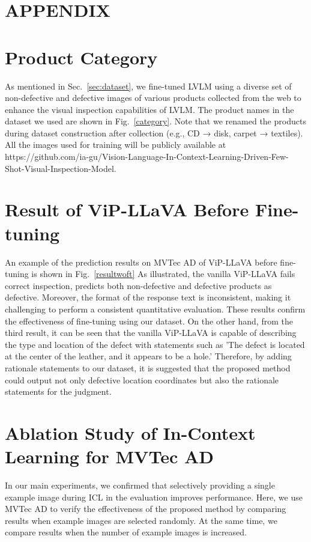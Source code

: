 \section*{\MakeUppercase{Appendix}}

\section{Product Category}
As mentioned in Sec.~\ref{sec:dataset}, we fine-tuned LVLM using a diverse set of non-defective and defective images of various products collected from the web to enhance the visual inspection capabilities of LVLM. 
% 
The product names in the dataset we used are shown in Fig.~\ref{category}. 
Note that we renamed the products during dataset construction after collection (e.g., CD → disk, carpet → textiles).
All the images used for training will be publicly available at https://github.com/ia-gu/Vision-Language-In-Context-Learning-Driven-Few-Shot-Visual-Inspection-Model.
\category

\section{Result of ViP-LLaVA Before Fine-tuning}
\resultwoft
An example of the prediction results on MVTec AD of ViP-LLaVA before fine-tuning is shown in Fig.~\ref{resultwoft} 
% 
As illustrated, the vanilla ViP-LLaVA fails correct inspection, predicts both non-defective and defective products as defective. 
% 
Moreover, the format of the response text is inconsistent, making it challenging to perform a consistent quantitative evaluation.
% 
These results confirm the effectiveness of fine-tuning using our dataset. 
% 
On the other hand, from the third result, it can be seen that the vanilla ViP-LLaVA is capable of describing the type and location of the defect with statements such as 'The defect is located at the center of the leather, and it appears to be a hole.' 
% 
Therefore, by adding rationale statements to our dataset, it is suggested that the proposed method could output not only defective location coordinates but also the rationale statements for the judgment.

\section{Ablation Study of In-Context Learning for MVTec AD}

In our main experiments, we confirmed that selectively providing a single example image during ICL in the evaluation improves performance.
% 
Here, we use MVTec AD to verify the effectiveness of the proposed method by comparing results when example images are selected randomly. 
At the same time, we compare results when the number of example images is increased.

